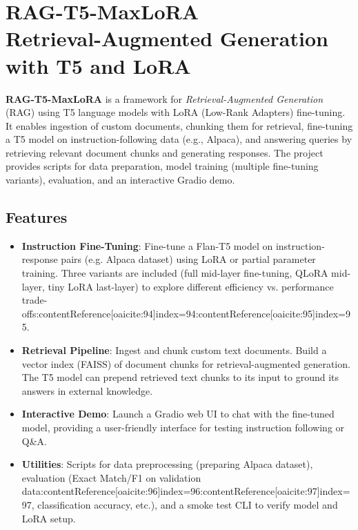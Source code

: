 \documentclass{article}
\begin{document}
\section*{RAG-T5-MaxLoRA \\ \large Retrieval-Augmented Generation with T5 and LoRA}
\label{sec:intro}

\textbf{RAG-T5-MaxLoRA} is a framework for \emph{Retrieval-Augmented Generation} (RAG) using T5 language models with LoRA (Low-Rank Adapters) fine-tuning. It enables ingestion of custom documents, chunking them for retrieval, fine-tuning a T5 model on instruction-following data (e.g., Alpaca), and answering queries by retrieving relevant document chunks and generating responses. The project provides scripts for data preparation, model training (multiple fine-tuning variants), evaluation, and an interactive Gradio demo.

\subsection*{Features}
\begin{itemize}
    \item \textbf{Instruction Fine-Tuning}: Fine-tune a Flan-T5 model on instruction-response pairs (e.g. Alpaca dataset) using LoRA or partial parameter training. Three variants are included (full mid-layer fine-tuning, QLoRA mid-layer, tiny LoRA last-layer) to explore different efficiency vs. performance trade-offs:contentReference[oaicite:94]{index=94}:contentReference[oaicite:95]{index=95}.
    \item \textbf{Retrieval Pipeline}: Ingest and chunk custom text documents. Build a vector index (FAISS) of document chunks for retrieval-augmented generation. The T5 model can prepend retrieved text chunks to its input to ground its answers in external knowledge.
    \item \textbf{Interactive Demo}: Launch a Gradio web UI to chat with the fine-tuned model, providing a user-friendly interface for testing instruction following or Q\&A.
    \item \textbf{Utilities}: Scripts for data preprocessing (preparing Alpaca dataset), evaluation (Exact Match/F1 on validation data:contentReference[oaicite:96]{index=96}:contentReference[oaicite:97]{index=97}, classification accuracy, etc.), and a smoke test CLI to verify model and LoRA setup.
\end{itemize}
\end{document}
